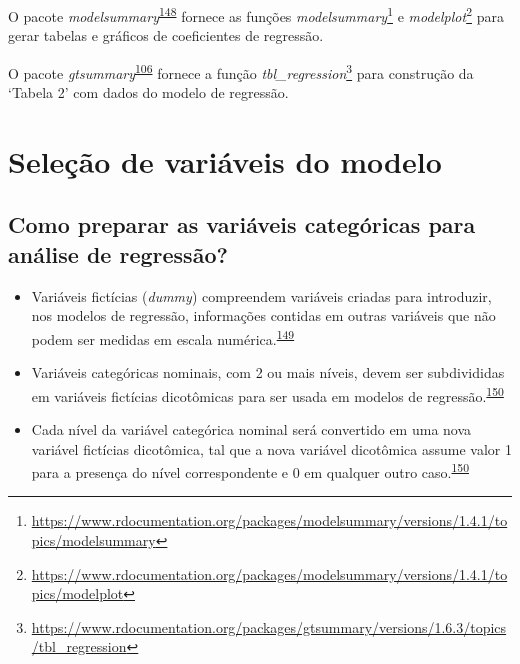 \documentclass[
  a4paper,
]{book}
\renewcommand{\href}[2]{#2\footnote{\url{#1}}}
\newenvironment{infobox}[1]
  {
  \begin{itemize}
  \renewcommand{\labelitemi}{
    \raisebox{-.7\height}[0pt][0pt]{
      {\setkeys{Gin}{width=3em,keepaspectratio}
        \texttt{[image: \#1]}}
    }
  }
  \setlength{\fboxsep}{1em}
  \begin{blackbox}
  \item
  }
  {
  \end{blackbox}
  \end{itemize}
  }
\begin{document}
\begin{infobox}{images/Rlogo}
O pacote \emph{modelsummary}\textsuperscript{\protect\hyperlink{ref-modelsummary}{148}} fornece as funções \href{https://www.rdocumentation.org/packages/modelsummary/versions/1.4.1/topics/modelsummary}{\emph{modelsummary}} e \href{https://www.rdocumentation.org/packages/modelsummary/versions/1.4.1/topics/modelplot}{\emph{modelplot}} para gerar tabelas e gráficos de coeficientes de regressão.

\end{infobox}

\begin{infobox}{images/Rlogo}
O pacote \emph{gtsummary}\textsuperscript{\protect\hyperlink{ref-gtsummary-2}{106}} fornece a função \href{https://www.rdocumentation.org/packages/gtsummary/versions/1.6.3/topics/tbl_regression}{\emph{tbl\_regression}} para construção da `Tabela 2' com dados do modelo de regressão.

\end{infobox}

\hypertarget{selecao}{%
\section{Seleção de variáveis do modelo}\label{selecao}}

\hypertarget{como-preparar-as-variuxe1veis-categuxf3ricas-para-anuxe1lise-de-regressuxe3o}{%
\subsection{Como preparar as variáveis categóricas para análise de regressão?}\label{como-preparar-as-variuxe1veis-categuxf3ricas-para-anuxe1lise-de-regressuxe3o}}

\begin{itemize}
\item
  Variáveis fictícias (\emph{dummy}) compreendem variáveis criadas para introduzir, nos modelos de regressão, informações contidas em outras variáveis que não podem ser medidas em escala numérica.\textsuperscript{\protect\hyperlink{ref-suits1957}{149}}
\item
  Variáveis categóricas nominais, com 2 ou mais níveis, devem ser subdivididas em variáveis fictícias dicotômicas para ser usada em modelos de regressão.\textsuperscript{\protect\hyperlink{ref-Healy1995}{150}}
\item
  Cada nível da variável categórica nominal será convertido em uma nova variável fictícias dicotômica, tal que a nova variável dicotômica assume valor 1 para a presença do nível correspondente e 0 em qualquer outro caso.\textsuperscript{\protect\hyperlink{ref-Healy1995}{150}}
\end{itemize}
\end{document}
